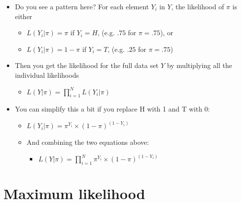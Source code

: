 \documentclass[]{article}
\begin{document}
\begin{itemize}
\itemsep1pt\parskip0pt
\item
  Do you see a pattern here? For each element $Y_i$ in $Y$, the
  likelihood of $\pi$ is either

  \begin{itemize}
  \itemsep1pt\parskip0pt
  \item
    $L(Y_i|\pi) = \pi$ if $Y_i = H$, (e.g. $.75$ for $\pi = .75$), or
  \item
    $L(Y_i|\pi) = 1 - \pi$ if $Y_i = T$, (e.g. $.25$ for $\pi = .75$)
  \end{itemize}
\item
  Then you get the likelihood for the full data set $Y$ by multiplying
  all the individual likelihoods

  \begin{itemize}
  \itemsep1pt\parskip0pt
  \item
    $L(Y|\pi) = \prod_{i = 1}^N{L(Y_i|\pi)}$
  \end{itemize}
\item
  You can simplify this a bit if you replace H with 1 and T with 0:

  \begin{itemize}
  \itemsep1pt\parskip0pt
  \item
    $L(Y_i|\pi) = \pi^{Y_i} \times (1-\pi)^{(1-Y_i)}$
  \item
    And combining the two equations above:

    \begin{itemize}
    \itemsep1pt\parskip0pt
    \item
      $L(Y|\pi) = \prod_{i = 1}^N\pi^{Y_i} \times (1-\pi)^{(1-Y_i)}$
    \end{itemize}
  \end{itemize}
\end{itemize}

\section{Maximum likelihood}\label{maximum-likelihood}
\end{document}
